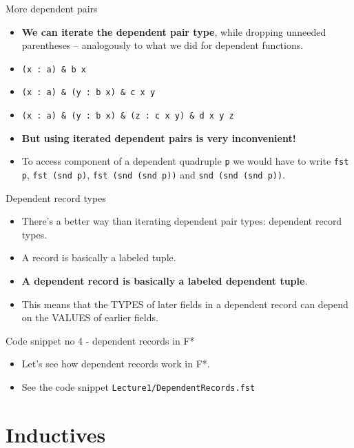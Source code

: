 \documentclass{beamer}
\newcommand{\m}[1]{\texttt{#1}}
\begin{document}
\begin{frame}{More dependent pairs}
\begin{itemize}
	\item \textbf{We can iterate the dependent pair type}, while dropping unneeded parentheses -- analogously to what we did for dependent functions.
	\item \m{(x :\ a) \& b x}
	\item \m{(x :\ a) \& (y :\ b x) \& c x y}
	\item \m{(x :\ a) \& (y :\ b x) \& (z :\ c x y) \& d x y z}
	\item \textbf{But using iterated dependent pairs is very inconvenient!}
	\item To access component of a dependent quadruple \m{p} we would have to write \m{fst p}, \m{fst (snd p)}, \m{fst (snd (snd p))} and \m{snd (snd (snd p))}.
\end{itemize}
\end{frame}

\begin{frame}{Dependent record types}
\begin{itemize}
	\item There's a better way than iterating dependent pair types: dependent record types.
	\item A record is basically a labeled tuple.
	\item \textbf{A dependent record is basically a labeled dependent tuple}.
	\item This means that the TYPES of later fields in a dependent record can depend on the VALUES of earlier fields.
\end{itemize}
\end{frame}

\begin{frame}{Code snippet no 4 - dependent records in F*}
\begin{itemize}
	\item Let's see how dependent records work in F*.
	\item See the code snippet \m{Lecture1/DependentRecords.fst}
\end{itemize}
\end{frame}

\section{Inductives}
\end{document}
